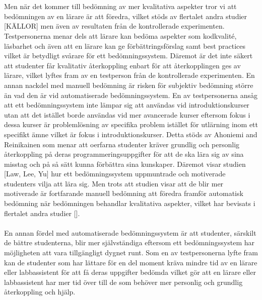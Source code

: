 \documentclass[a4paper,11pt]{article}
\begin{document}
{\\
\\
Men när det kommer till bedömning av mer kvalitativa aspekter tror vi att bedömningen av en lärare är att föredra, vilket stöds av flertalet andra studier [KÄLLOR] men även av resultaten från de kontrollerade experimenten. Testpersonerna menar dels att lärare kan bedöma aspekter som kodkvalité, läsbarhet och även att en lärare kan ge förbättringsförslag samt best practices vilket är betydligt svårare för ett bedömningssystem. Däremot är det inte säkert att studenter får kvalitativ återkoppling enbart för att återkopplingen ges av lärare, vilket lyftes fram av en testperson från de kontrollerade experimenten. En annan nackdel med manuell bedömning är risken för subjektiv bedömning större än vad den är vid automatiserade bedömningssystem. En av testpersonerna ansåg att ett bedömningssystem inte lämpar sig att användas vid introduktionskurser utan att det istället borde användas vid mer avancerade kurser eftersom fokus i dessa kurser är problemlösning av specifika problem istället för utlärning inom ett specifikt ämne vilket är fokus i introduktionskurser. Detta stöds av Ahoniemi and Reinikainen som menar att oerfarna studenter kräver grundlig och personlig återkoppling på deras programmeringsuppgifter för att de ska lära sig av sina misstag och på så sätt kunna förbättra sina kunskaper. Däremot visar studien [Law, Lee, Yu] hur ett bedömningssystem uppmuntrade och motiverade studenters vilja att lära sig. Men trots att studien visar att de blir mer motiverade är fortfarande manuell bedömning att föredra framför automatisk bedömning när bedömningen behandlar kvalitativa aspekter, vilket har bevisats i flertalet andra studier [].
\\
\\
En annan fördel med automatiserade bedömningssystem är att studenter, särskilt de bättre studenterna, blir mer självständiga eftersom ett bedömningssystem har möjligheten att vara tillgängligt dygnet runt. Som en av testpersonerna lyfte fram kan de studenter som har lättare för en del moment kräva mindre tid av en lärare eller labbassistent för att få deras uppgifter bedömda vilket gör att en lärare eller labbassistent har mer tid över till de som behöver mer personlig och grundlig återkoppling och hjälp.
\\
\\
}
\end{document}
